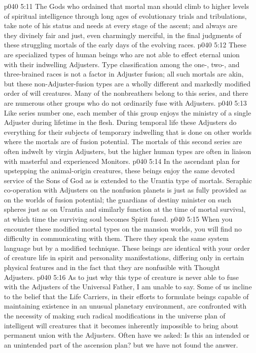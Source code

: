 \vs p040 5:11 \pc The Gods who ordained that mortal man should climb to higher levels of spiritual intelligence through long ages of evolutionary trials and tribulations, take note of his status and needs at every stage of the ascent; and always are they divinely fair and just, even charmingly merciful, in the final judgments of these struggling mortals of the early days of the evolving races.
\vs p040 5:12 \pc {} These are specialized types of human beings who are not able to effect eternal union with their indwelling Adjusters. Type classification among the one-, two-, and three\hyp{}brained races is not a factor in Adjuster fusion; all such mortals are akin, but these non\hyp{}Adjuster\hyp{}fusion types are a wholly different and markedly modified order of will creatures. Many of the nonbreathers belong to this series, and there are numerous other groups who do not ordinarily fuse with Adjusters.
\vs p040 5:13 Like series number one, each member of this group enjoys the ministry of a single Adjuster during lifetime in the flesh. During temporal life these Adjusters do everything for their subjects of temporary indwelling that is done on other worlds where the mortals are of fusion potential. The mortals of this second series are often indwelt by virgin Adjusters, but the higher human types are often in liaison with masterful and experienced Monitors.
\vs p040 5:14 In the ascendant plan for upstepping the animal\hyp{}origin creatures, these beings enjoy the same devoted service of the Sons of God as is extended to the Urantia type of mortals. Seraphic co\hyp{}operation with Adjusters on the nonfusion planets is just as fully provided as on the worlds of fusion potential; the guardians of destiny minister on such spheres just as on Urantia and similarly function at the time of mortal survival, at which time the surviving soul becomes Spirit fused.
\vs p040 5:15 When you encounter these modified mortal types on the mansion worlds, you will find no difficulty in communicating with them. There they speak the same system language but by a modified technique. These beings are identical with your order of creature life in spirit and personality manifestations, differing only in certain physical features and in the fact that they are nonfusible with Thought Adjusters.
\vs p040 5:16 As to just why this type of creature is never able to fuse with the Adjusters of the Universal Father, I am unable to say. Some of us incline to the belief that the Life Carriers, in their efforts to formulate beings capable of maintaining existence in an unusual planetary environment, are confronted with the necessity of making such radical modifications in the universe plan of intelligent will creatures that it becomes inherently impossible to bring about permanent union with the Adjusters. Often have we asked: Is this an intended or an unintended part of the ascension plan? but we have not found the answer.

